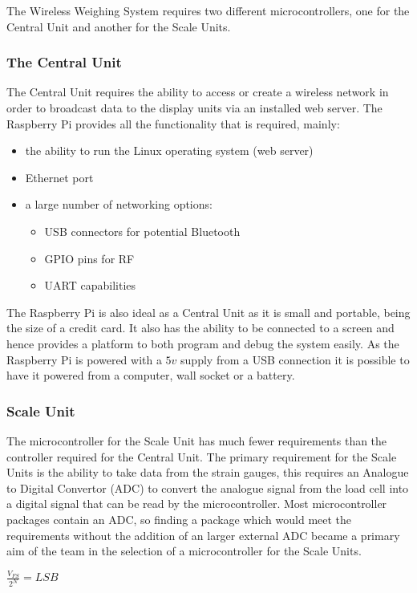 The Wireless Weighing System requires two different microcontrollers, one for the Central Unit and another for the Scale Units. 
\subsubsection{The Central Unit}
The Central Unit requires the ability to access or create a wireless network in order to broadcast data to the display units via an installed web server. The Raspberry Pi provides all the functionality that is required, mainly:
	\begin{itemize}
		\item the ability to run the Linux operating system (web server)
		\item Ethernet port
		\item a large number of networking options:
			\begin{itemize} 
				\item USB connectors for potential Bluetooth
				\item GPIO pins for RF
				\item UART capabilities
			\end{itemize}
	\end{itemize}
The Raspberry Pi is also ideal as a Central Unit as it is small and portable, being the size of a credit card. It also has the ability to be connected to a screen and hence provides a platform to both program and debug the system easily. As the Raspberry Pi is powered with a $5v$ supply from a USB connection it is possible to have it powered from a computer, wall socket or a battery.

\subsubsection{Scale Unit}
The microcontroller for the Scale Unit has much fewer requirements than the controller required for the Central Unit. The primary requirement for the Scale Units is the ability to take data from the strain gauges, this requires an Analogue to Digital Convertor (ADC) to convert the analogue signal from the load cell into a digital signal that can be read by the microcontroller. Most microcontroller packages contain an ADC, so finding a package which would meet the requirements without the addition of an larger external ADC became a primary aim of the team in the selection of a microcontroller for the Scale Units. 

\centerline{\(\frac{V_{FS}}{2^{N}} = LSB  \)}
\label{LSBeq}

